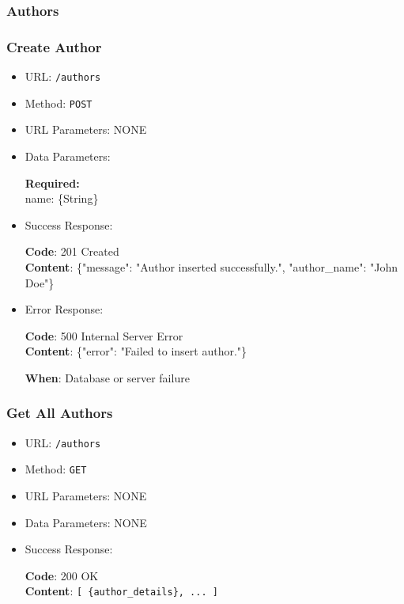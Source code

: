 \subsubsection*{Authors}

\subsubsection*{Create Author}

\begin{itemize}
    \item URL: \texttt{/authors}
    \item Method: \texttt{POST}
    \item URL Parameters: NONE
    \item Data Parameters:

    \textbf{Required:} \\
    name: \{String\}

    \item Success Response: \newline

    \textbf{Code}: 201 Created \\
    \textbf{Content}: \{"message": "Author inserted successfully.", "author\_name": "John Doe"\}

    \item Error Response: \newline

    \textbf{Code}: 500 Internal Server Error \\
    \textbf{Content}: \{"error": "Failed to insert author."\}

    \textbf{When}: Database or server failure
\end{itemize}

\subsubsection*{Get All Authors}

\begin{itemize}
    \item URL: \texttt{/authors}
    \item Method: \texttt{GET}
    \item URL Parameters: NONE
    \item Data Parameters: NONE

    \item Success Response: \newline

    \textbf{Code}: 200 OK \\
    \textbf{Content}: \texttt{[ \{author\_details\}, ... ]}
\end{itemize}

